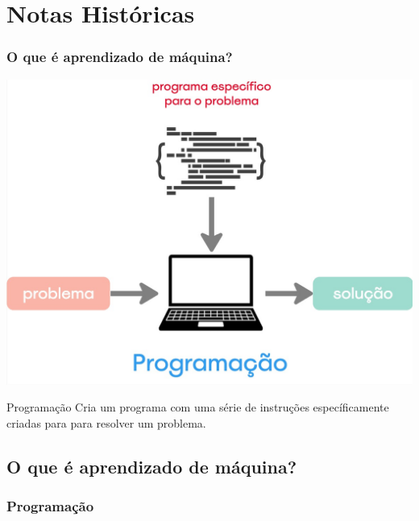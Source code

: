 \section*{Notas Históricas}

\begin{frame}[plain]
\end{frame}

\begin{frame}[plain]
\end{frame}

\begin{frame}
    \frametitle{O que é aprendizado de máquina?}
    \begin{center}
        \includegraphics[height=0.4\paperheight]{./imgs/fig3-programacao.jpg}
    \end{center}
    \begin{block}{Programação}
        Cria um programa com uma série de instruções específicamente criadas para para resolver um problema.
    \end{block}
\end{frame}


\subsection{O que é aprendizado de máquina?}
\subsubsection{Programação}

